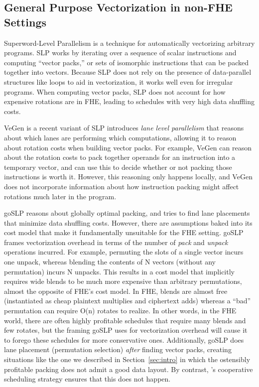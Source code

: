 \subsection{General Purpose Vectorization in non-FHE Settings}
Superword-Level Parallelism \cite{SLP} is a technique for automatically vectorizing arbitrary programs.
SLP works by iterating over a sequence of scalar instructions and computing ``vector packs,'' or sets of isomorphic instructions that can be packed together into vectors.
Because SLP does not rely on the presence of data-parallel structures like loops to aid in vectorization, it works well even for irregular programs.
When computing vector packs, SLP does not account for how expensive rotations are in FHE, leading to schedules with very high data shuffling costs. 

VeGen \cite{VeGen} is a recent variant of SLP introduces {\em lane level parallelism} that reasons about which lanes are performing which computations, allowing it to reason about rotation costs when building vector packs.
For example, VeGen can reason about the rotation costs to pack together operands for an instruction into a temporary vector, and can use this to decide whether or not packing those instructions is worth it.
However, this reasoning only happens locally, and VeGen does not incorporate information about how instruction packing might affect rotations much later in the program.

goSLP \cite{goSLP} reasons about globally optimal packing, and tries to find lane placements that minimize data shuffling costs. 
However, there are assumptions baked into its cost model that make it fundamentally unsuitable for the FHE setting.
goSLP frames vectorization overhead in terms of the number of {\em pack} and {\em unpack} operations incurred.
For example, permuting the slots of a single vector incurs one unpack, whereas blending the contents of N vectors (without any permutation) incurs N unpacks.
This results in a cost model that implicitly requires wide blends to be much more expensive than arbitrary permutations, almost the opposite of FHE's cost model. In FHE, blends are almost free (instantiated as cheap plaintext multiplies and ciphertext adds) whereas a ``bad'' permutation can require O(n) rotates to realize.
In other words, in the FHE world, there are often highly profitable schedules that require many blends and few rotates, but the framing goSLP uses for vectorization overhead will cause it to forego these schedules for more conservative ones.
Additionally, goSLP does lane placement (permutation selection) {\em after} finding vector packs, creating situations like the one we described in Section~\ref{sec:intro} in which the ostensibly profitable packing does not admit a good data layout.
By contrast, \system's cooperative scheduling strategy ensures that this does not happen.

